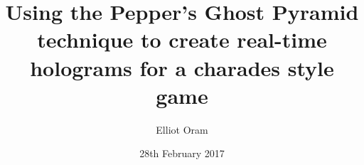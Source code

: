 
\title{Using the Pepper’s Ghost Pyramid technique to create real-time holograms for a charades style game}

\author{Elliot Oram}




\date{28th February 2017} %




\maketitle



